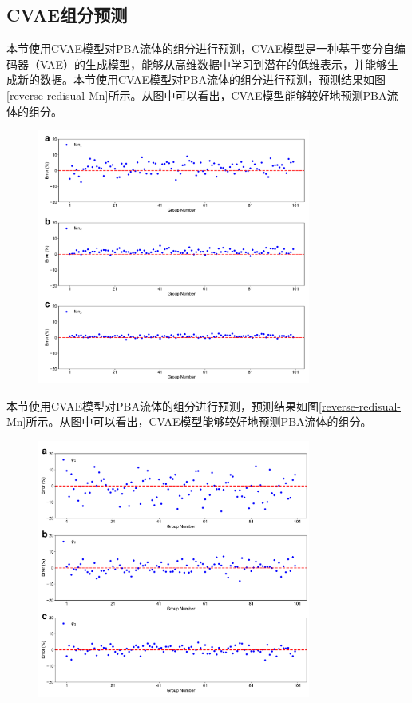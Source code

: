 \subsection{CVAE组分预测}
本节使用CVAE模型对PBA流体的组分进行预测，CVAE模型是一种基于变分自编码器（VAE）的生成模型，能够从高维数据中学习到潜在的低维表示，并能够生成新的数据。本节使用CVAE模型对PBA流体的组分进行预测，预测结果如图\ref{reverse-redisual-Mn}所示。从图中可以看出，CVAE模型能够较好地预测PBA流体的组分。

\begin{figure}[htbp]
  \centering
  \includegraphics[width=0.8\textwidth]{Fig/reverse-redisual-Mn.pdf}
\end{figure}
本节使用CVAE模型对PBA流体的组分进行预测，预测结果如图\ref{reverse-redisual-Mn}所示。从图中可以看出，CVAE模型能够较好地预测PBA流体的组分。
\begin{figure}[htbp]
  \centering
  \includegraphics[width=0.8\textwidth]{Fig/reverse-redisual-phi.pdf}
\end{figure}

